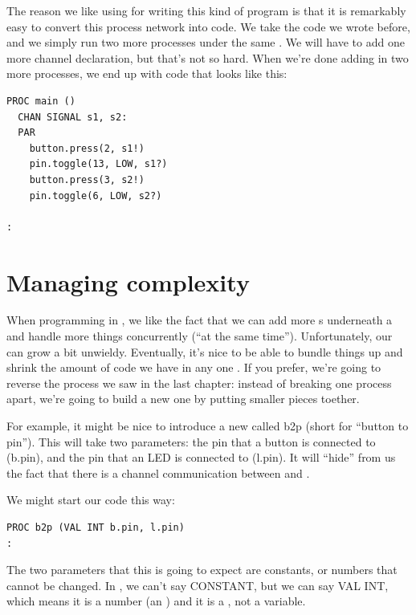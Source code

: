 The reason we like using \occam for writing this kind of program is that it is remarkably easy to convert this process network into code. We take the code we wrote before, and we simply run two more processes under the same \PAR. We will have to add one more channel declaration, but that's not so hard. When we're done adding in two more processes, we end up with code that looks like this:

\vspace{6mm}
\begin{lstlisting}
PROC main ()
  CHAN SIGNAL s1, s2:
  PAR
    button.press(2, s1!)
    pin.toggle(13, LOW, s1?)
    button.press(3, s2!)
    pin.toggle(6, LOW, s2?)

:
\end{lstlisting}

\newpage

\section{Managing complexity}
When programming in \occam, we like the fact that we can add more {\PROCedure}s underneath a \PAR and handle more things concurrently (``at the same time''). Unfortunately, our \PAR can grow a bit unwieldy. Eventually, it's nice to be able to bundle things up and shrink the amount of code we have in any one \PROC. If you prefer, we're going to reverse the process we saw in the last chapter: instead of breaking one process apart, we're going to build a new one by putting smaller pieces toether.

For example, it might be nice to introduce a new \PROC called {\code b2p} (short for ``button to pin''). This \PROCedure will take two parameters: the pin that a button is connected to ({\code b.pin}), and the pin that an LED is connected to ({\code l.pin}). It will ``hide'' from us the fact that there is a channel communication between \bp and \tp. 
 
We might start our code this way:

\vspace{3mm}
\begin{lstlisting}
PROC b2p (VAL INT b.pin, l.pin)
:
\end{lstlisting}

The two parameters that this \PROCedure is going to expect are {\strong constants}, or numbers that cannot be changed. In \occam, we can't say {\code CONSTANT}, but we can say {\code VAL INT}, which means it is a number (an \INTeger) and it is a \VALue, not a variable. 


